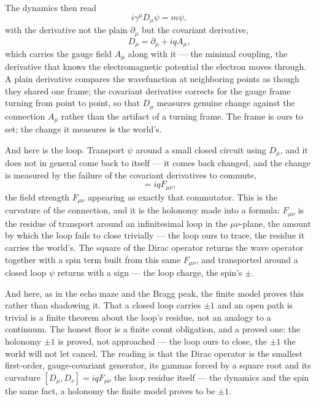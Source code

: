 The dynamics then read
\begin{equation}
  i\gamma^\mu D_\mu \psi = m\psi,
\end{equation}
with the derivative not the plain $\partial_\mu$ but the covariant derivative,
\begin{equation}
  D_\mu = \partial_\mu + iq A_\mu,
\end{equation}
which carries the gauge field $A_\mu$ along with it --- the minimal coupling, the derivative that knows the
electromagnetic potential the electron moves through. A plain derivative compares the wavefunction at neighboring
points as though they shared one frame; the covariant derivative corrects for the gauge frame turning from
point to point, so that $D_\mu$ measures genuine change against the connection $A_\mu$ rather than the
artifact of a turning frame. The frame is ours to set; the change it measures is the world's.

And here is the loop. Transport $\psi$ around a small closed circuit using $D_\mu$, and it does not in
general come back to itself --- it comes back changed, and the change is measured by the failure of the
covariant derivatives to commute,
\begin{equation}
  [D_\mu, D_\nu] = iq F_{\mu\nu},
\end{equation}
the field strength $F_{\mu\nu}$ appearing as exactly that commutator. This is the curvature of the connection,
and it is the holonomy made into a formula: $F_{\mu\nu}$ is the residue of transport around an infinitesimal
loop in the $\mu\nu$-plane, the amount by which the loop fails to close trivially --- the loop ours to trace,
the residue it carries the world's. The square of the Dirac
operator returns the wave operator together with a spin term built from this same $F_{\mu\nu}$, and transported
around a closed loop $\psi$ returns with a sign --- the loop charge, the spin's $\pm$.

And here, as in the echo maze and the Bragg peak, the finite model proves this rather than shadowing it. That
a closed loop carries $\pm 1$ and an open path is trivial is a finite theorem about the loop's residue, not an
analogy to a continuum. The honest floor is a finite count obligation, and a proved one: the holonomy $\pm 1$
is proved, not approached --- the loop ours to close, the $\pm 1$ the world will not let cancel. The reading is
that the Dirac operator is the smallest first-order, gauge-covariant generator, its gammas forced by a square
root and its curvature $[D_\mu, D_\nu] = iq F_{\mu\nu}$ the loop residue itself --- the dynamics and the spin
the same fact, a holonomy the finite model proves to be $\pm 1$.

